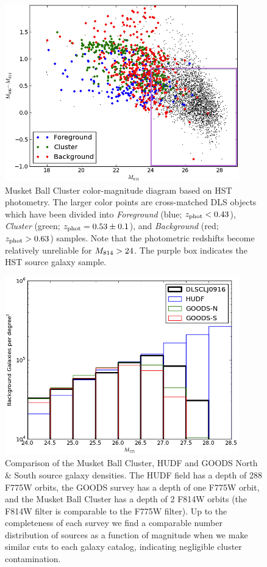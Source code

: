 \begin{figure}
\centering
\includegraphics[width=4in]{Chapter2/HSTcolormag_wBPZ.png}
\caption[Musket Ball Cluster color-magnitude diagram based on HST photometry, along with galaxy location based on DLS photometric redshifts.]{Musket Ball Cluster color-magnitude diagram based on HST photometry.  The larger color points are cross-matched DLS objects which have been divided into \emph{Foreground} (blue; $z_{\rm phot}<0.43$), \emph{Cluster} (green; $z_{\rm phot}=0.53\pm0.1$), and \emph{Background} (red; $z_{\rm phot}>0.63$) samples.  Note that the photometric redshifts become relatively unreliable for $M_{\rm 814}>24$. 
The purple box indicates the HST source galaxy sample.  
\label{figure:HSTcolormag}}
\end{figure}

\begin{figure}
\centering
\includegraphics[width=4in]{Chapter2/UDF_GOODS_sourcemaghist.png}
\caption[Comparison of the Musket Ball Cluster, HUDF and GOODS North \& South source galaxy densities.]{Comparison of the Musket Ball Cluster, HUDF \citep{Coe:2006jf} and GOODS North \& South \citep{Giavalisco:2004kl} source galaxy densities.
The HUDF field has a depth of 288 F775W orbits, the GOODS survey has a depth of one F775W orbit, and the Musket Ball Cluster has a depth of 2 F814W orbits (the F814W filter is comparable to the F775W filter).
Up to the completeness of each survey we find a comparable number distribution of sources as a function of magnitude when we make similar cuts to each galaxy catalog, indicating negligible cluster contamination.
\label{figure:HSTsourcedensity}}
\end{figure}

